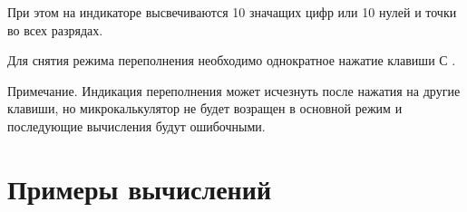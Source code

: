 \documentclass[12pt]{article} %
\begin{document}
При этом на индикаторе высвечиваются 10 значащих цифр или 10 нулей и точки во всех разрядах.

Для снятия режима переполнения необходимо однократное нажатие клавиши С .

Примечание. Индикация переполнения может исчезнуть после нажатия на другие клавиши, но микрокалькулятор не будет возращен в основной режим и последующие вычисления будут ошибочными.

\section{Примеры вычислений}
\end{document}
